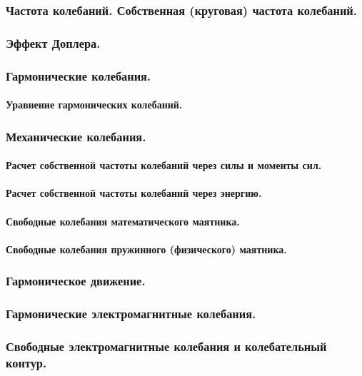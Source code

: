 \documentclass{article}
\begin{document}
        \subsubsection{Частота колебаний. Собственная (круговая) частота колебаний.}
        \subsubsection{Эффект Доплера.}
        \subsubsection{Гармонические колебания.}
            \paragraph{Уравнение гармонических колебаний.}
        \subsubsection{Механические колебания.}
            \paragraph{Расчет собственной частоты колебаний через силы и моменты сил.}
            \paragraph{Расчет собственной частоты колебаний через энергию.}
            \paragraph{Свободные колебания математического маятника.}
            \paragraph{Свободные колебания пружинного (физического) маятника.}
        \subsubsection{Гармоническое движение.}
        \subsubsection{Гармонические электромагнитные колебания.}
        \subsubsection{Свободные электромагнитные колебания и колебательный контур.}
\end{document}
